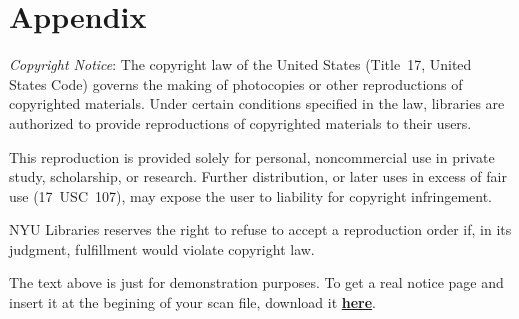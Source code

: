 \chapter*{Appendix}
\label{ch:copyright}
\emph{Copyright Notice}: The copyright law of the United States (Title~17, United States Code) governs the making of photocopies or other reproductions of copyrighted materials. Under certain conditions specified in the law, libraries are authorized to provide reproductions of copyrighted materials to their users. 

This reproduction is provided solely for personal, noncommercial use in private study, scholarship, or research. Further distribution, or later uses in excess of fair use (17~USC~107), may expose the user to liability for copyright infringement. 

NYU Libraries reserves the right to refuse to accept a reproduction order if, in its judgment, fulfillment would violate copyright law.

\vspace*{5ex}
\begin{table}[h]
    \centering
    \begin{notebox}
    The text above is just for demonstration purposes. To get a real notice page and insert it at the begining of your scan file, download it \href{https://drive.google.com/file/d/1RYeaF8WN9-wScZwtvwWpVi97VbFYKama/view?usp=sharing}{\textbf{here}}. 
    \end{notebox}
    \label{note: copyright}
\end{table}